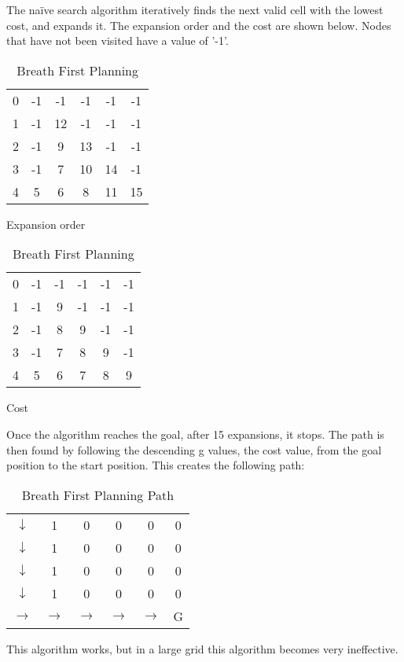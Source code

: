 \documentclass[Main]{subfiles}
\begin{document}
The naïve search algorithm iteratively finds the next valid cell with the lowest cost, and expands it. 
The expansion order and the cost are shown below. 
Nodes that have not been visited have a value of '-1'.
\begin{table}[H]
	\begin{subtable}{0.5\linewidth}
		\centering
		\begin{tabular}{cccccc}
			0 & -1 & -1 & -1 & -1 & -1  \\ 
			1 & -1 & 12 & -1 & -1 & -1  \\ 
			2 & -1 &  9 & 13 & -1 & -1  \\ 
			3 & -1 &  7 & 10 & 14 & -1  \\  
			4 &  5 &  6 &  8 & 11 & 15  \\ 
		\end{tabular}
	\caption{Expansion order}
	\label{table:expansion_order} 
	\end{subtable}
	\begin{subtable}{0.5\linewidth}
		\centering
		\begin{tabular}{cccccc}
			0 & -1 & -1 & -1 & -1 & -1  \\ 
			1 & -1 &  9 & -1 & -1 & -1  \\ 
			2 & -1 &  8 &  9 & -1 & -1  \\ 
			3 & -1 &  7 &  8 &  9 & -1  \\  
			4 &  5 &  6 &  7 &  8 &  9  \\ 
		\end{tabular}
	\caption{Cost}
	\label{table:cost_order} 
	\end{subtable}
\caption{Breath First Planning}
\end{table} \noindent
Once the algorithm reaches the goal, after 15 expansions, it stops. 
The path is then found by following the descending g values, the cost value, from the goal position to the start position.
This creates the following path:
\begin{table}[H]
	\centering
	\begin{tabular}{cccccc}
		$\downarrow$ & 1 & 0 & 0 & 0 & 0  \\ 
		$\downarrow$ & 1 & 0 & 0 & 0 & 0  \\ 
		$\downarrow$ & 1 & 0 & 0 & 0 & 0  \\ 
		$\downarrow$ & 1 & 0 & 0 & 0 & 0  \\  
		$\rightarrow$ & $\rightarrow$ & $\rightarrow$ & $\rightarrow$ & $\rightarrow$ & G  \\ 
	\end{tabular}
\caption{Breath First Planning Path}
\label{table:path_map} 
\end{table} \noindent
This algorithm works, but in a large grid this algorithm becomes very ineffective.
\end{document}

